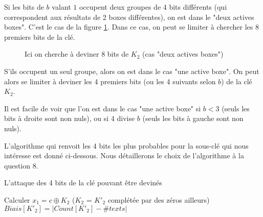 Si les bits de $b$ valant $1$ occupent deux groupes de 4 bits différents (qui correspondent aux résultats de 2 boxes différentes), on est dans le "deux actives boxes". C'est le cas de la figure \ref{illustration_bits_key}. Dans ce cas, on peut se limiter à chercher les 8 premiers bits de la clé.


\begin{figure}[!ht]
\centering
{}
\caption{Ici on cherche à deviner 8 bits de $K_2$ (cas "deux actives boxes")}
\label{illustration_bits_key}
\end{figure}


S'ils occupent un seul groupe, alors on est dans le cas "une active boxe". On peut alors se limiter à deviner les 4 premiers bits (ou les 4 suivants selon $b$) de la clé $K_2$.

Il est facile de voir que l'on est dans le cas "une active boxe" si $b < 3$ (seuls les bits à droite sont non nuls), ou si $4$ divise $b$ (seuls les bits à gauche sont non nuls).

L'algorithme qui renvoit les 4 bits les plus probables pour la sous-clé qui nous intéresse est donné ci-dessous. Nous détaillerons le choix de l'algorithme à la question 8.

\begin{algorithm}
\caption{L'attaque des 4 bits de la clé pouvant être devinés}
	{
		{
			{
				Calculer $x_1 = c \oplus K_2$ ($K_2$ = $K'_2$ complétée par des zéros ailleurs) \\
			}
		$Biais[K'_2] = | Count[K'_2] - \# texts |$
		}
		
	}
\end{algorithm}


